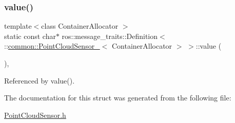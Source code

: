 \subsubsection{\texorpdfstring{value()}{value()}\hspace{0.1cm}{\footnotesize\ttfamily [2/2]}}
{\footnotesize\ttfamily template$<$class Container\+Allocator $>$ \\
static const char$\ast$ ros\+::message\+\_\+traits\+::\+Definition$<$ \+::\hyperlink{structcommon_1_1PointCloudSensor__}{common\+::\+Point\+Cloud\+Sensor\+\_\+}$<$ Container\+Allocator $>$ $>$\+::value (\begin{DoxyParamCaption}\item[{const \+::\hyperlink{structcommon_1_1PointCloudSensor__}{common\+::\+Point\+Cloud\+Sensor\+\_\+}$<$ Container\+Allocator $>$ \&}]{ }\end{DoxyParamCaption})\hspace{0.3cm}{\ttfamily [inline]}, {\ttfamily [static]}}



Referenced by value().



The documentation for this struct was generated from the following file\+:\begin{DoxyCompactItemize}
\item 
\hyperlink{PointCloudSensor_8h}{Point\+Cloud\+Sensor.\+h}\end{DoxyCompactItemize}
